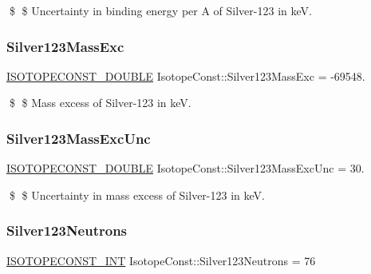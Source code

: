 \$ \$ Uncertainty in binding energy per A of Silver-\/123 in keV. \mbox{\label{group___isotope_const-_silver-_ag123_ga37fa0012b4b3be8349c1ad164cff8a43}} 
\subsubsection{\texorpdfstring{Silver123\+Mass\+Exc}{Silver123MassExc}}
{\footnotesize\ttfamily \mbox{\hyperlink{group___isotope_const-_macros_ga8f45a7272ce02c0b4c65c44636ed719a}{I\+S\+O\+T\+O\+P\+E\+C\+O\+N\+S\+T\+\_\+\+D\+O\+U\+B\+LE}} Isotope\+Const\+::\+Silver123\+Mass\+Exc = -\/69548.}

\$ \$ Mass excess of Silver-\/123 in keV. \mbox{\label{group___isotope_const-_silver-_ag123_ga58e57643100d1f925b7115f9629bda14}} 
\subsubsection{\texorpdfstring{Silver123\+Mass\+Exc\+Unc}{Silver123MassExcUnc}}
{\footnotesize\ttfamily \mbox{\hyperlink{group___isotope_const-_macros_ga8f45a7272ce02c0b4c65c44636ed719a}{I\+S\+O\+T\+O\+P\+E\+C\+O\+N\+S\+T\+\_\+\+D\+O\+U\+B\+LE}} Isotope\+Const\+::\+Silver123\+Mass\+Exc\+Unc = 30.}

\$ \$ Uncertainty in mass excess of Silver-\/123 in keV. \mbox{\label{group___isotope_const-_silver-_ag123_ga5d55f7701ea998bc542a629f300220dc}} 
\subsubsection{\texorpdfstring{Silver123\+Neutrons}{Silver123Neutrons}}
{\footnotesize\ttfamily \mbox{\hyperlink{group___isotope_const-_macros_ga5f18360b3e99483a35c32d789e62621c}{I\+S\+O\+T\+O\+P\+E\+C\+O\+N\+S\+T\+\_\+\+I\+NT}} Isotope\+Const\+::\+Silver123\+Neutrons = 76}

